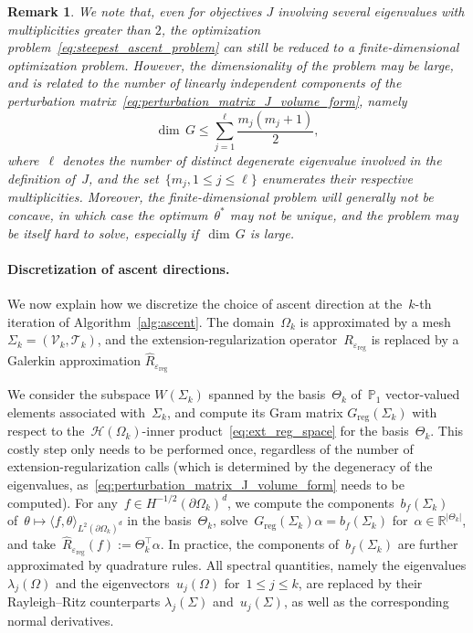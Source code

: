 \documentclass[a4]{article}
\newcommand{\R}{\mathbb{R}}
\newcommand{\reg}{\mathrm{reg}}
\newcommand{\1}{\mathbbm 1}
\newtheorem{remark}{Remark}
\begin{document}
\begin{remark}
    We note that, even for objectives $J$ involving several eigenvalues with multiplicities greater than $2$, the optimization problem~\eqref{eq:steepest_ascent_problem} can still be reduced to a finite-dimensional optimization problem.
    However, the dimensionality of the problem may be large, and is related to the number of linearly independent components of the perturbation matrix~\eqref{eq:perturbation_matrix_J_volume_form}, namely
    $$ \dim\,G \leq \sum_{j=1}^{\ell} \frac{m_j(m_j+1)}{2},$$
    where~$\ell$ denotes the number of distinct degenerate eigenvalue involved in the definition of~$J$, and the set~$\{m_j,1\leq j\leq \ell\}$ enumerates their respective multiplicities.
    Moreover, the finite-dimensional problem will generally not be concave, in which case the optimum~$\theta^*$ may not be unique, and the problem may be itself hard to solve, especially if~$\dim\, G$ is large.
\end{remark}

\paragraph{Discretization of ascent directions.}
We now explain how we discretize the choice of ascent direction at the~$k$-th iteration of Algorithm~\ref{alg:ascent}. The domain~$\Omega_k$ is approximated by a mesh~$\Sigma_k =(\mathcal V_k,\mathcal T_k)$, and the extension-regularization operator~$R_{\varepsilon_\reg}$ is replaced by a Galerkin approximation $\widehat{R}_{\varepsilon_\reg}$

We consider the subspace $W(\Sigma_k)$ spanned by the basis~$\Theta_k$ of~$\mathbb P_1$ vector-valued elements associated with~$\Sigma_k$, and compute its Gram matrix $G_\reg(\Sigma_k)$ with respect to the~$\mathcal H(\Omega_k)$-inner product~\eqref{eq:ext_reg_space} for the basis~$\Theta_k$. This costly step only needs to be performed once, regardless of the number of extension-regularization calls (which is determined by the degeneracy of the eigenvalues, as~\eqref{eq:perturbation_matrix_J_volume_form} needs to be computed).
For any~$f\in H^{-1/2}(\partial\Omega_k)^d$, we compute the components~$b_f(\Sigma_k)$ of~$\theta\mapsto\langle f,\theta\rangle_{L^2(\partial\Omega_k)^d}$ in the basis~$\Theta_k$, solve~$G_\reg(\Sigma_k)\alpha = b_f(\Sigma_k)$ for~$\alpha\in\R^{|\Theta_k|}$, and take~$\widehat{R}_{\varepsilon_\reg}(f):=\Theta_k^\top\alpha$. In practice, the components of~$b_f(\Sigma_k)$ are further approximated by quadrature rules.
All spectral quantities, namely the eigenvalues $\lambda_j(\Omega)$ and the eigenvectors~$u_j(\Omega)$ for~$1\leq j\leq k$, are replaced by their Rayleigh--Ritz counterparts $\lambda_j(\Sigma)$ and~$u_j(\Sigma)$, as well as the corresponding normal derivatives.
\end{document}
